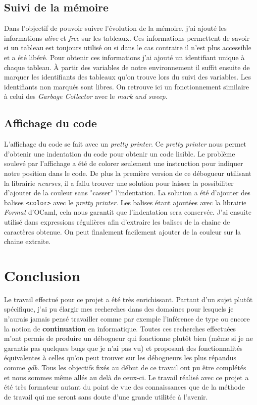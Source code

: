 \documentclass{article}
\begin{document}
\subsection{Suivi de la mémoire}
Dans l'objectif de pouvoir suivre l'évolution de la mémoire, j'ai ajouté 
les informations \textit{alive} et \textit{free} sur les tableaux. Ces 
informations permettent de savoir si un tableau est toujours utilisé ou si 
dans le cas contraire il n'est plus accessible et a été libéré. Pour obtenir 
ces informations j'ai ajouté un identifiant unique à chaque tableau. À partir des 
variables de notre environnement il suffit ensuite de marquer les identifiants des 
tableaux qu'on trouve lors du suivi des variables. Les identifiants non marqués sont 
libres. On retrouve ici un fonctionnement similaire à celui des \textit{Garbage Collector} 
avec le \textit{mark and sweep}.

\subsection{Affichage du code}
L'affichage du code se fait avec un \textit{pretty printer}. Ce \textit{pretty printer} nous 
permet d'obtenir une indentation du code pour obtenir un code lisible. Le 
problème soulevé par l'affichage a été de colorer seulement une instruction pour 
indiquer notre position dans le code. De plus la première version de ce débogueur 
utilisant la librairie \textit{ncurses}, il a fallu trouver une solution pour laisser 
la possibiliter d'ajouter de la couleur sans "casser" l'indentation. La solution 
a été d'ajouter des balises \verb|<color>| avec le \textit{pretty printer}. Les 
balises étant ajoutées avec la librairie \textit{Format} d'OCaml, cela nous garantit 
que l'indentation sera conservée. J'ai ensuite utilisé dans expressions régulières afin 
d'extraire les balises de la chaine de caractères obtenue. On peut finalement facilement 
ajouter de la couleur sur la chaine extraite.

\section{Conclusion}
Le travail effectué pour ce projet a été très enrichissant. Partant d'un sujet plutôt 
spécifique, j'ai pu élargir mes recherches dans des domaines pour lesquels je n'aurais 
jamais pensé travailler comme par exemple l'inférence de type ou encore la notion de 
\textbf{continuation} en informatique. Toutes ces recherches effectuées m'ont permis 
de produire un débogueur qui fonctionne plutôt bien (même si je ne garantis pas quelques 
 bugs que je n'ai pas vu) et proposant des fonctionnalités équivalentes à celles 
 qu'on peut trouver sur les débogueurs les plus répandus comme \textit{gdb}.
 Tous les objectifs fixés au début de ce travail ont pu être complétés et nous 
sommes même allés au delà de ceux-ci. Le travail réalisé avec ce projet a été 
très formateur autant du point de vue des connaissances que de la méthode de 
travail qui me seront sans doute d'une grande utilitée à l'avenir.
\end{document}
